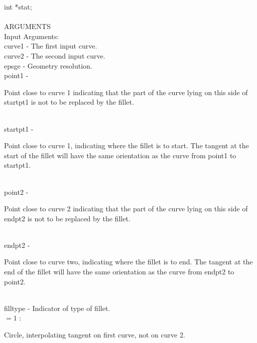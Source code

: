                 \>\>    int     \>      *{\fov stat};\\
\\
ARGUMENTS\\
        \>Input Arguments:\\
        \>\>    {\fov curve1}   \> - \> The first input curve.\\
        \>\>    {\fov curve2}   \> - \> The second input curve.\\
        \>\>    {\fov epsge}    \> - \> Geometry resolution.\\
        \>\>    {\fov point1}   \> - \> \begin{minipg2}
                        Point close to curve 1 indicating that the part of the
                        curve lying on this side of startpt1 is
                        not to be replaced by the fillet.
                                \end{minipg2}\\[0.3ex]
        \>\>    {\fov startpt1}\> - \>  \begin{minipg2}
                        Point close to curve 1, indicating where the fillet is
                        to start. The tangent at the start of the fillet will
                        have the same orientation as the curve
                        from point1 to startpt1.
                                \end{minipg2}\\[0.3ex]
        \>\>    {\fov point2}   \> - \> \begin{minipg2}
                        Point close to curve 2 indicating that the part of the
                        curve lying on this side of endpt2 is not
                        to be replaced by the fillet.
                                \end{minipg2}\\[0.8ex]
        \>\>    {\fov endpt2}   \> - \> \begin{minipg2}
                        Point close to curve two, indicating where the fillet
                        is to end. The tangent at the end of the fillet will
                        have the same orientation as the curve
                        from endpt2 to point2.
                                \end{minipg2}\\[0.3ex]
\newpagetabs
        \>\>    {\fov filltype}\> - \>  Indicator of type of fillet.\\
                \>\>\>\>\>      $=1$ : \>\begin{minipg5}
                                Circle, interpolating tangent on first
                                curve, not on curve 2.
                                \end{minipg5}\\[0.3ex]
